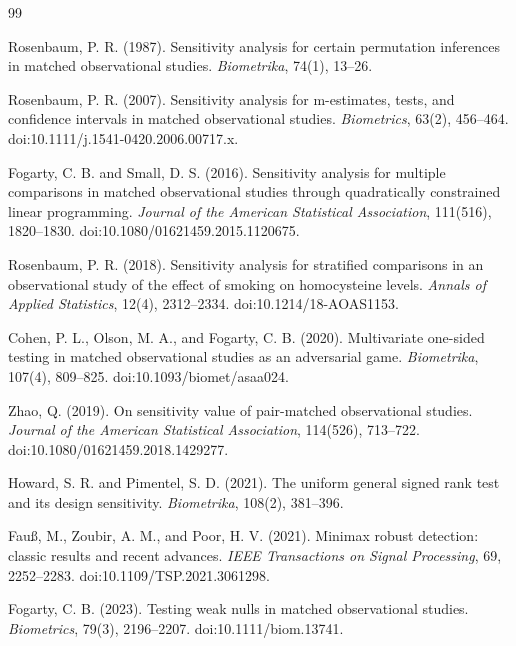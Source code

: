 \documentclass{article}
\begin{document}
\begin{thebibliography}{99}

   Rosenbaum, P. R. (1987). Sensitivity analysis for certain permutation inferences in matched observational studies. \emph{Biometrika}, 74(1), 13--26.

   Rosenbaum, P. R. (2007). Sensitivity analysis for m-estimates, tests, and confidence intervals in matched observational studies. \emph{Biometrics}, 63(2), 456--464. doi:10.1111/j.1541-0420.2006.00717.x.

   Fogarty, C. B. and Small, D. S. (2016). Sensitivity analysis for multiple comparisons in matched observational studies through quadratically constrained linear programming. \emph{Journal of the American Statistical Association}, 111(516), 1820--1830. doi:10.1080/01621459.2015.1120675.

   Rosenbaum, P. R. (2018). Sensitivity analysis for stratified comparisons in an observational study of the effect of smoking on homocysteine levels. \emph{Annals of Applied Statistics}, 12(4), 2312--2334. doi:10.1214/18-AOAS1153.

   Cohen, P. L., Olson, M. A., and Fogarty, C. B. (2020). Multivariate one-sided testing in matched observational studies as an adversarial game. \emph{Biometrika}, 107(4), 809--825. doi:10.1093/biomet/asaa024.

   Zhao, Q. (2019). On sensitivity value of pair-matched observational studies. \emph{Journal of the American Statistical Association}, 114(526), 713--722. doi:10.1080/01621459.2018.1429277.

   Howard, S. R. and Pimentel, S. D. (2021). The uniform general signed rank test and its design sensitivity. \emph{Biometrika}, 108(2), 381--396.

   Fauß, M., Zoubir, A. M., and Poor, H. V. (2021). Minimax robust detection: classic results and recent advances. \emph{IEEE Transactions on Signal Processing}, 69, 2252--2283. doi:10.1109/TSP.2021.3061298.

   Fogarty, C. B. (2023). Testing weak nulls in matched observational studies. \emph{Biometrics}, 79(3), 2196--2207. doi:10.1111/biom.13741.

\end{thebibliography}
\end{document}
